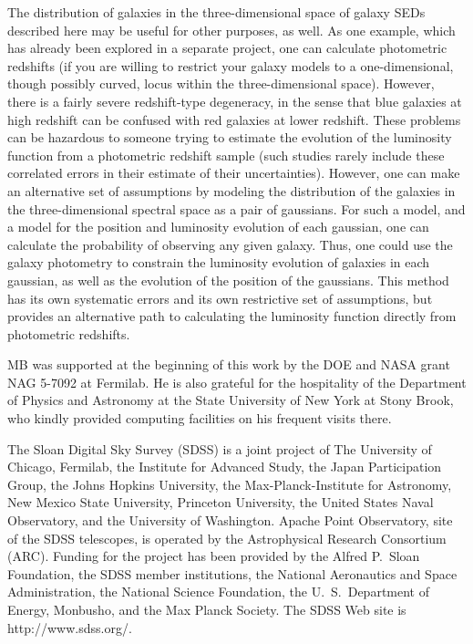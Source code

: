 \documentclass[10pt,preprint]{aastex}
\begin{document}
The distribution of galaxies in the three-dimensional space of galaxy
SEDs described here may be useful for other purposes, as well. As one
example, which has already been explored in a separate project, one
can calculate photometric redshifts (if you are willing to restrict
your galaxy models to a one-dimensional, though possibly curved, locus
within the three-dimensional space). However, there is a fairly severe
redshift-type degeneracy, in the sense that blue galaxies at high
redshift can be confused with red galaxies at lower redshift. These
problems can be hazardous to someone trying to estimate the evolution
of the luminosity function from a photometric redshift sample (such
studies rarely include these correlated errors in their estimate of
their uncertainties). However, one can make an alternative set of
assumptions by modeling the distribution of the galaxies in the
three-dimensional spectral space as a pair of gaussians. For such a
model, and a model for the position and luminosity evolution of each
gaussian, one can calculate the probability of observing any given
galaxy. Thus, one could use the galaxy photometry to constrain the
luminosity evolution of galaxies in each gaussian, as well as the
evolution of the position of the gaussians. This method has its own
systematic errors and its own restrictive set of assumptions, but
provides an alternative path to calculating the luminosity function
directly from photometric redshifts.

\acknowledgments

MB was supported at the beginning of this work by the DOE and NASA
grant NAG 5-7092 at Fermilab. He is also grateful for the hospitality
of the Department of Physics and Astronomy at the State University of
New York at Stony Brook, who kindly provided computing facilities on
his frequent visits there. 

The Sloan Digital Sky Survey (SDSS) is a joint project of The
University of Chicago, Fermilab, the Institute for Advanced Study, the
Japan Participation Group, the Johns Hopkins University, the
Max-Planck-Institute for Astronomy, New Mexico State University,
Princeton University, the United States Naval Observatory, and the
University of Washington. Apache Point Observatory, site of the SDSS
telescopes, is operated by the Astrophysical Research Consortium
(ARC).  Funding for the project has been provided by the Alfred
P.~Sloan Foundation, the SDSS member institutions, the National
Aeronautics and Space Administration, the National Science Foundation,
the U.~S.~Department of Energy, Monbusho, and the Max Planck
Society. The SDSS Web site is http://www.sdss.org/.
 
\begin{thebibliography}{DUM}

\end{thebibliography}

\newpage




\end{document}
